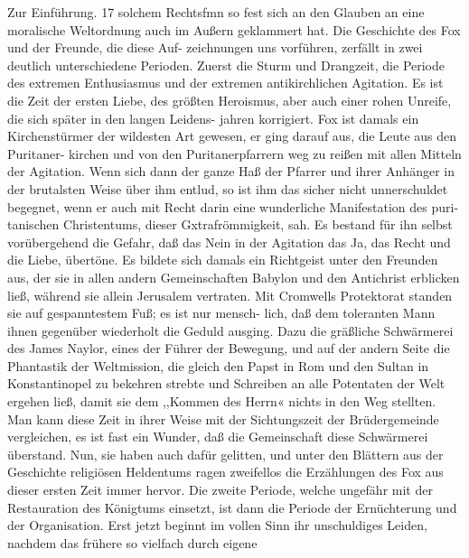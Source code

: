 Zur Einführung. 17
solchem Rechtsfmn so fest sich an den Glauben an eine moralische
Weltordnung auch im Außern geklammert hat.
Die Geschichte des Fox und der Freunde, die diese Auf-
zeichnungen uns vorführen, zerfällt in zwei deutlich unterschiedene
Perioden. Zuerst die Sturm und Drangzeit, die Periode des
extremen Enthusiasmus und der extremen antikirchlichen Agitation.
Es ist die Zeit der ersten Liebe, des größten Heroismus, aber
auch einer rohen Unreife, die sich später in den langen Leidens-
jahren korrigiert. Fox ist damals ein Kirchenstürmer der wildesten
Art gewesen, er ging darauf aus, die Leute aus den Puritaner-
kirchen und von den Puritanerpfarrern weg zu reißen mit allen
Mitteln der Agitation. Wenn sich dann der ganze Haß der
Pfarrer und ihrer Anhänger in der brutalsten Weise über ihm
entlud, so ist ihm das sicher nicht unnerschuldet begegnet, wenn
er auch mit Recht darin eine wunderliche Manifestation des puri-
tanischen Christentums, dieser Gxtrafrömmigkeit, sah. Es bestand
für ihn selbst vorübergehend die Gefahr, daß das Nein in der
Agitation das Ja, das Recht und die Liebe, übertöne. Es bildete
sich damals ein Richtgeist unter den Freunden aus, der sie in
allen andern Gemeinschaften Babylon und den Antichrist erblicken
ließ, während sie allein Jerusalem vertraten. Mit Cromwells
Protektorat standen sie auf gespanntestem Fuß; es ist nur mensch-
lich, daß dem toleranten Mann ihnen gegenüber wiederholt die
Geduld ausging. Dazu die gräßliche Schwärmerei des James
Naylor, eines der Führer der Bewegung, und auf der andern
Seite die Phantastik der Weltmission, die gleich den Papst in
Rom und den Sultan in Konstantinopel zu bekehren strebte und
Schreiben an alle Potentaten der Welt ergehen ließ, damit sie
dem ,,Kommen des Herrn« nichts in den Weg stellten. Man
kann diese Zeit in ihrer Weise mit der Sichtungszeit der
Brüdergemeinde vergleichen, es ist fast ein Wunder, daß die
Gemeinschaft diese Schwärmerei überstand. Nun, sie haben auch
dafür gelitten, und unter den Blättern aus der Geschichte religiösen
Heldentums ragen zweifellos die Erzählungen des Fox aus dieser
ersten Zeit immer hervor.
Die zweite Periode, welche ungefähr mit der Restauration
des Königtums einsetzt, ist dann die Periode der Ernüchterung
und der Organisation. Erst jetzt beginnt im vollen Sinn ihr
unschuldiges Leiden, nachdem das frühere so vielfach durch eigene


